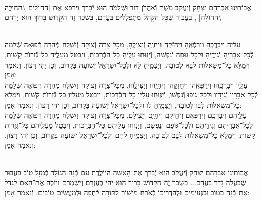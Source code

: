 \documentclass[twoside, openany, parskip=half, 11pt]{book}
\begin{document}
\begin{small}

\\
אֲבוֹתֵינוּ אַבְרָהָם יִצְחָק וְֿיַעֲקֹב מֹשֶׁה וְֿאַהֲרֹן דָּוִד וּשְׁלֹמֹה הוּא יְֿבָרֵךְ וִירַפֵּא אֶת־[הַחוׂלִים \textbackslash הַחוׂלֶה \textbackslash הַחוׂלָה]
,
בּעֲבוּר שְֿׁכָּל הַקָּהָל מִתְפַּלְֿלִים בַּעֲדָם, בִּשְׂכַר זֶה
הַקָּדוֹשׁ בָּרוּךְ הוּא יְֿרַחֵם
\setcolumnwidth{1.4in,1.4in,1.4in}
\begin{paracol}{3}
\\
עָלֵָיהָ וִיבָרֲכֶֽהָ וִירַפְּֿאֶֽהָ וִיחַזְּֿקֶֽהָ וִיחַיֶּֽהָ וְֿיַצִּילֶֽהָ, מִכׇּל־צָרָה וְֿצוּקָה וְֿיִשְׁלַח מְֿהֵרָה רְֿפוּאָה שְֿׁלֵמָה לְֿכׇל־אֵבָרָיהָ וְֿגִידֶֽיהָ וּלְכׇל־גּוּפָהּ וְֿנַפְשָׁהּ, וְֿיָנֽוּחוּ עָלְֶיהָ כָּל־הַבְּֿרָכוׂת, וִיבַטֵּל מֵעָלֶֽיהָ כָּל־גְּֿֿזֵרוׂת קָשׁוׂת, וִימַלֵּא כׇל־מִשְׁאֲלוׂת לִבָּהּ לְֿטוׂבָה, וְֿיַצְמִֽיחַ לָהּ וּלְכׇל־יִשְׂרָאֵל יְֿשׁוּעָה בְּֿקָרוׂב, וְֿכֵן יְֿהִי רָצוׂן. וְֿנֹאמַר אָמֵן:
\switchcolumn
{}\\
עָלֵָיו וִיבָרֲכֵֽהוּ וִירַפְּֿאֵֽהוּ וִיחַזְּֿקֵהוּ וִיחַיֵּֽהוּ וְֿיַצִּילֵֽהוּ, מִכׇּל־צָרָה וְֿצוּקָה וְֿיִשְׁלַח מְֿהֵרָה רְֿפוּאָה שְֿׁלֵמָה לְֿכׇל־אֵבָרָיו וְֿגִידָיו וּלְכׇל־גּוּפוּ וְֿנַפְשׁוׂ, וְֿיָנֽוּחוּ עָלָיו כָּל־הַבְּֿרָכוׂת, וִיבַטֵּל מֵעָלָיו כָּל־גְּֿֿזֵרוׂת קָשׁוׂת, וִימַלֵּא כׇל־מִשְׁאֲלוׂת לִבּוׂ לְֿטוׂבָה, וְֿיַצְמִֽיחַ לוׂ וּלְכׇל־יִשְׂרָאֵל יְֿשׁוּעָה בְּֿקָרוׂב, וְֿכֵן יְֿהִי רָצוׂן. וְֿנֹאמַר אָמֵן:
\switchcolumn
{}\\
עָלֵָיהֶם וִיבָרֲכְֶם וִירַפְּֿאֶֽם וִיחַזְּֿקֶֽם וִיחַיֶּֽם וְֿיַצִּילֶֽם, מִכׇּל־צָרָה וְֿצוּקָה וְֿיִשְׁלַח מְֿהֵרָה רְֿפוּאָה שְֿׁלֵמָה לְֿכׇל־אֵבָרָיהֶם וְֿגִידֶֽיהֶם וּלְכׇל־גּוּפָם וְֿנַפְשָׁם, וְֿיָנֽוּחוּ עָלְֶיהֶם כָּל־הַבְּֿרָכוׂת, וִיבַטֵּל מֵעָלֶֽיהֶם כָּל־גְּֿֿזֵרוׂת קָשׁוׂת, וִימַלֵּא כׇל־מִשְׁאֲלוׂת לִבָּם לְֿטוׂבָה, וְֿיַצְמִֽיחַ לְֿהֶם וּלְכׇל־יִשְׂרָאֵל יְֿשׁוּעָה בְּֿקָרוׂב, וְֿכֵן יְֿהִי רָצוׂן. וְֿנֹאמַר אָמֵן:
\end{paracol}

\vspace{\baselineskip}

\\
אֲבוֹתֵֽינוּ אַבְרָהָם יִצְחָק וְֿיַעֲקֹב הוּא יְֿבָרֵךְ אֶת־הָאִשָׁה הַיוֹלֶֽדֶת
עִם בְּֿנָה הַנוֹלָד בְּֿמַזָל טוֹב בַּעֲבוּר שֶׁבַּעֲלָה נָדַר בַּעֲדָם... בִּשְׂכַר זֶה הַקָדוֹשׁ בָּרוּךְ הוּא יְֿהִי בְּֿעֶזְרָם וְֿיִשְׁמְרֵם וִיזַכֶּה אֶת־הָאֵם לְֿגַדֵל אֶת־בְּֿנָה בַּטוֹב וּבַנְעִימִים וּלְהַדְרִיכוֹ בְּֿאֹֽרַח מִישׁוֹר לַתּוֹרָה לְֿחֻפָּה וּלְמַעֲשִׂים טוֹבִים. וְֿנֹאמַר אָמֵן:


\end{small}
\end{document}
